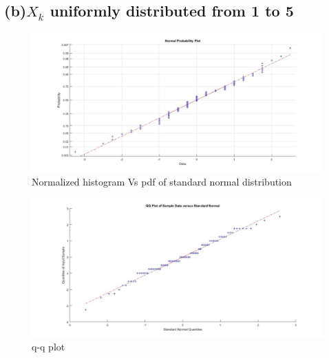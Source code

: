 \documentclass[a4paper,11pt]{article}
\begin{document}
\subsection*{(b)\quad $X_k$ uniformly distributed from 1 to 5}
\begin{figure}[h]
   \hspace*{-4cm}
    \includegraphics[scale=0.4]{q2_b_1}
    \caption{Normalized histogram Vs pdf of standard normal distribution}\label{fig:q2_b_1}
\end{figure}
\begin{figure}[h]
   \hspace*{-4cm}
    \includegraphics[scale=0.4]{q2_b_2}
    \caption{q-q plot}\label{fig:q2_b_2}
\end{figure}
\newpage
\clearpage
\end{document}
